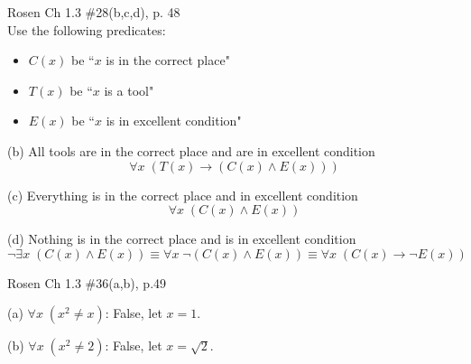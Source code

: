 \documentclass[12pt]{exam}
\newenvironment{my_item}{
\begin{itemize}
    \setlength{\itemsep}{1pt}
    \setlength{\parskip}{0pt}
    \setlength{\parsep}{0pt}
}{\end{itemize}}
\begin{document}
\begin{questions}
\question[6] Rosen Ch 1.3 \#28(b,c,d), p. 48\\
Use the following predicates:
\begin{itemize}
    \item $C(x)$ be ``$x$ is in the correct place"
    \item $T(x)$ be ``$x$ is a tool"
    \item $E(x)$ be ``$x$ is in excellent condition"
\end{itemize}
    \begin{solution}
    \begin{my_item}
        \item[(b)] All tools are in the correct place and are in excellent condition
        $$ \forall x\; (T(x) \rightarrow (C(x) \wedge E(x))) $$
        \item[(c)] Everything is in the correct place and in excellent condition
        $$ \forall x\; (C(x) \wedge E(x)) $$
        \item[(d)] Nothing is in the correct place and is in excellent condition
        $$ \neg \exists x\; (C(x) \wedge E(x)) \equiv \forall x\; \neg (C(x) \wedge E(x)) \equiv \forall x\; (C(x) \rightarrow \neg E(x))$$
    \end{my_item}
    \end{solution}


\question[4] Rosen Ch 1.3 \#36(a,b), p.49
    \begin{solution}
    \begin{my_item}
        \item[(a)] $\forall x\; (x^2 \neq x)$: False, let $x=1$.
        \item[(b)] $\forall x\; (x^2 \neq 2)$: False, let $x = \sqrt{2}$.
    \end{my_item}
    \end{solution}



\end{questions}
\end{document}
